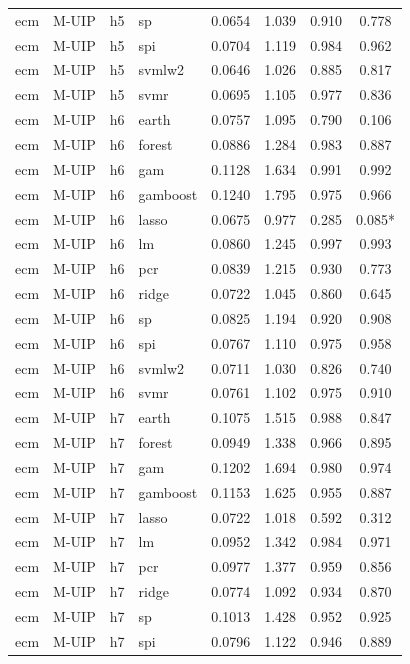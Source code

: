 \begin{ThreePartTable}
\begin{longtable}[t]{llclcccc}
ecm & M-UIP & h5 & sp & 0.0654 & 1.039 & 0.910 & 0.778\\
ecm & M-UIP & h5 & spi & 0.0704 & 1.119 & 0.984 & 0.962\\
ecm & M-UIP & h5 & svmlw2 & 0.0646 & 1.026 & 0.885 & 0.817\\
ecm & M-UIP & h5 & svmr & 0.0695 & 1.105 & 0.977 & 0.836\\
\addlinespace
ecm & M-UIP & h6 & earth & 0.0757 & 1.095 & 0.790 & 0.106\\
ecm & M-UIP & h6 & forest & 0.0886 & 1.284 & 0.983 & 0.887\\
ecm & M-UIP & h6 & gam & 0.1128 & 1.634 & 0.991 & 0.992\\
ecm & M-UIP & h6 & gamboost & 0.1240 & 1.795 & 0.975 & 0.966\\
ecm & M-UIP & h6 & lasso & 0.0675 & 0.977 & 0.285 & 0.085*\\
ecm & M-UIP & h6 & lm & 0.0860 & 1.245 & 0.997 & 0.993\\
ecm & M-UIP & h6 & pcr & 0.0839 & 1.215 & 0.930 & 0.773\\
ecm & M-UIP & h6 & ridge & 0.0722 & 1.045 & 0.860 & 0.645\\
ecm & M-UIP & h6 & sp & 0.0825 & 1.194 & 0.920 & 0.908\\
ecm & M-UIP & h6 & spi & 0.0767 & 1.110 & 0.975 & 0.958\\
ecm & M-UIP & h6 & svmlw2 & 0.0711 & 1.030 & 0.826 & 0.740\\
ecm & M-UIP & h6 & svmr & 0.0761 & 1.102 & 0.975 & 0.910\\
\addlinespace
ecm & M-UIP & h7 & earth & 0.1075 & 1.515 & 0.988 & 0.847\\
ecm & M-UIP & h7 & forest & 0.0949 & 1.338 & 0.966 & 0.895\\
ecm & M-UIP & h7 & gam & 0.1202 & 1.694 & 0.980 & 0.974\\
ecm & M-UIP & h7 & gamboost & 0.1153 & 1.625 & 0.955 & 0.887\\
ecm & M-UIP & h7 & lasso & 0.0722 & 1.018 & 0.592 & 0.312\\
ecm & M-UIP & h7 & lm & 0.0952 & 1.342 & 0.984 & 0.971\\
ecm & M-UIP & h7 & pcr & 0.0977 & 1.377 & 0.959 & 0.856\\
ecm & M-UIP & h7 & ridge & 0.0774 & 1.092 & 0.934 & 0.870\\
ecm & M-UIP & h7 & sp & 0.1013 & 1.428 & 0.952 & 0.925\\
ecm & M-UIP & h7 & spi & 0.0796 & 1.122 & 0.946 & 0.889\\

\end{longtable}
\end{ThreePartTable}
